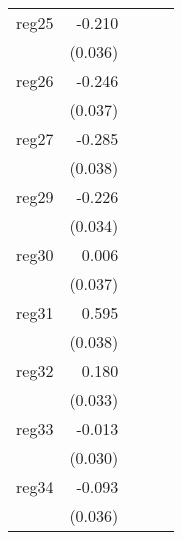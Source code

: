 {\begin{longtable}{l*{4}{D{.}{.}{-1}}}
\addlinespace
reg25       &      -0.210\sym{***}&                     &                     &                     \\
            &     (0.036)         &                     &                     &                     \\
\addlinespace
reg26       &      -0.246\sym{***}&                     &                     &                     \\
            &     (0.037)         &                     &                     &                     \\
\addlinespace
reg27       &      -0.285\sym{***}&                     &                     &                     \\
            &     (0.038)         &                     &                     &                     \\
\addlinespace
reg29       &      -0.226\sym{***}&                     &                     &                     \\
            &     (0.034)         &                     &                     &                     \\
\addlinespace
reg30       &       0.006         &                     &                     &                     \\
            &     (0.037)         &                     &                     &                     \\
\addlinespace
reg31       &       0.595\sym{***}&                     &                     &                     \\
            &     (0.038)         &                     &                     &                     \\
\addlinespace
reg32       &       0.180\sym{***}&                     &                     &                     \\
            &     (0.033)         &                     &                     &                     \\
\addlinespace
reg33       &      -0.013         &                     &                     &                     \\
            &     (0.030)         &                     &                     &                     \\
\addlinespace
reg34       &      -0.093\sym{*}  &                     &                     &                     \\
            &     (0.036)         &                     &                     &                     \\

\end{longtable}}
